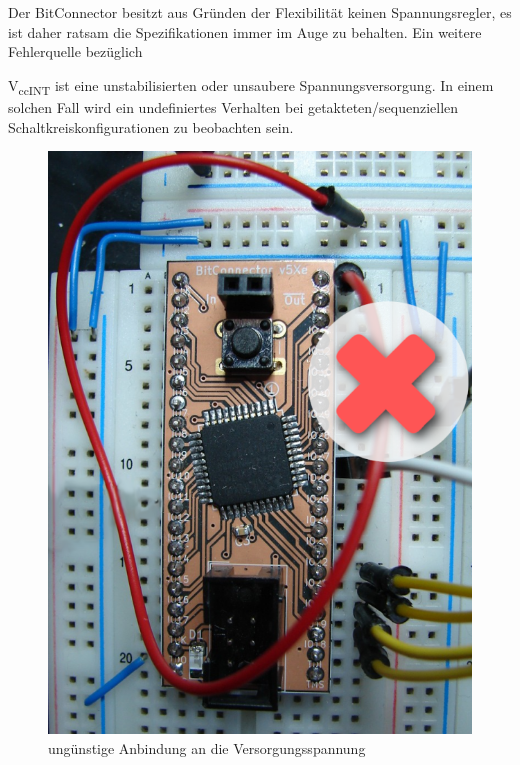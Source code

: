 \documentclass{article}
\begin{document}
Der BitConnector besitzt aus Gründen der Flexibilität keinen Spannungsregler, es ist daher ratsam die Spezifikationen immer im Auge zu behalten. Ein weitere Fehlerquelle bezüglich {V\textsubscript{ccINT} ist eine unstabilisierten oder unsaubere Spannungsversorgung. In einem solchen Fall wird ein undefiniertes Verhalten bei getakteten/sequenziellen Schaltkreiskonfigurationen zu beobachten sein. 

\begin{figure}[!h]
	\begin{minipage}[!b]{.43\linewidth} %
		\includegraphics[width=\linewidth]{Board_Vcc_incorrect}
		\caption{ungünstige Anbindung an die Versorgungsspannung}
		\label{fig:VCC_fail}
	\end{minipage}
	\hspace{.1\linewidth}%
	\begin{minipage}[!b]{.45\linewidth} %

\end{minipage}
\end{figure}}
\end{document}
